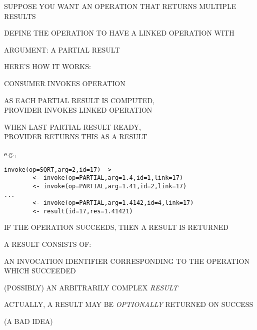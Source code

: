 \begin{bwslide}

\begin{nrtc}
\item	SUPPOSE YOU WANT AN OPERATION THAT RETURNS MULTIPLE RESULTS

\item	DEFINE THE OPERATION TO HAVE A LINKED OPERATION WITH
    \begin{nrtc}
    \item	ARGUMENT: A PARTIAL RESULT
    \end{nrtc}

\item	HERE'S HOW IT WORKS:
    \begin{nrtc}
    \item	CONSUMER INVOKES OPERATION

    \item	AS EACH PARTIAL RESULT IS COMPUTED,\\
		PROVIDER INVOKES LINKED OPERATION

    \item	WHEN LAST PARTIAL RESULT READY,\\
		PROVIDER RETURNS THIS AS A RESULT
    \end{nrtc}
    e.g.,
\end{nrtc}
\begin{verbatim}
invoke(op=SQRT,arg=2,id=17) ->
        <- invoke(op=PARTIAL,arg=1.4,id=1,link=17)
        <- invoke(op=PARTIAL,arg=1.41,id=2,link=17)
...
        <- invoke(op=PARTIAL,arg=1.4142,id=4,link=17)
        <- result(id=17,res=1.41421)
\end{verbatim}
\end{bwslide}


\begin{bwslide}

\begin{nrtc}
\item	IF THE OPERATION SUCCEEDS, THEN A RESULT IS RETURNED

\item	A RESULT CONSISTS OF:
    \begin{nrtc}
    \item	AN INVOCATION IDENTIFIER CORRESPONDING TO THE OPERATION WHICH
		SUCCEEDED

    \item	(POSSIBLY) AN ARBITRARILY COMPLEX \emph{RESULT}
    \end{nrtc}

\item	ACTUALLY, A RESULT MAY BE \emph{OPTIONALLY} RETURNED ON SUCCESS
    \begin{nrtc}
    \item	(A BAD IDEA)
    \end{nrtc}
\end{nrtc}
\end{bwslide}


